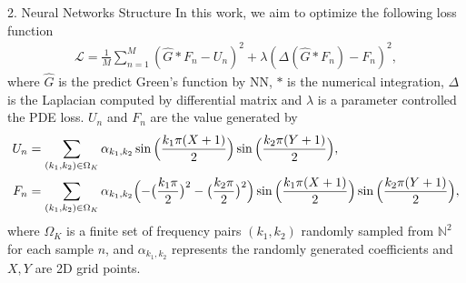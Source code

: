 \begin{frame}{2. Neural Networks Structure}
In this work, we aim to optimize the following loss function
\begin{align}
    \mathcal{L}=\frac{1}{M}\sum_{n=1}^{M}\left( \hat{G} * F_n -U_n\right)^2 + \lambda\left( \displaystyle \Delta(\hat{G} * F_n)  - F_n \right)^2,
\end{align}
where $\hat{G}$ is the predict Green's function by NN, $*$ is the numerical integration, $\displaystyle \Delta$ is the Laplacian computed by differential matrix and $\lambda$ is a parameter controlled the PDE loss.
$U_n$ and $F_n$ are the value generated by
\begin{align}
    U_n&=\sum_{(k_1, k_2) \in \Omega_K} \alpha_{k_1, k_2} \sin{\Bigl( \frac{k_1\pi(X+1)}{2} \Bigr)}\sin{\Bigl( \frac{k_2\pi(Y+1)}{2} \Bigr)},\\
    F_n&=\sum_{(k_1, k_2) \in \Omega_K} \alpha_{k_1, k_2} \Bigl( - \bigl( \frac{k_1\pi}{2} \bigr)^2 - \bigl( \frac{k_2\pi}{2} \bigr)^2 \Bigr) \sin{\Bigl( \frac{k_1\pi(X+1)}{2} \Bigr)}\sin{\Bigl( \frac{k_2\pi(Y+1)}{2} \Bigr)},
\end{align} 
where $\Omega_K$ is a finite set of frequency pairs $(k_1, k_2)$ randomly sampled from $\mathbb{N}^2$ for each sample $n$,
 and $\alpha_{k_1, k_2}$ represents the randomly generated coefficients and $X, Y$ are 2D grid points. 
\end{frame}



